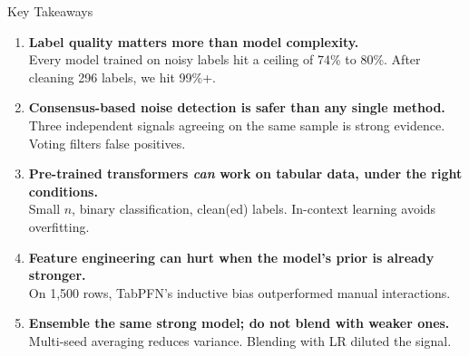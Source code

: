 \documentclass[aspectratio=169, 11pt]{beamer}
\begin{document}
\begin{frame}{Key Takeaways}

\begin{enumerate}
  \item \textbf{Label quality matters more than model complexity.}\\
        Every model trained on noisy labels hit a ceiling of 74\% to 80\%. After cleaning 296 labels, we hit 99\%+.

  \vspace{0.3em}
  \item \textbf{Consensus-based noise detection is safer than any single method.}\\
        Three independent signals agreeing on the same sample is strong evidence. Voting filters false positives.

  \vspace{0.3em}
  \item \textbf{Pre-trained transformers \textit{can} work on tabular data, under the right conditions.}\\
        Small $n$, binary classification, clean(ed) labels. In-context learning avoids overfitting.

  \vspace{0.3em}
  \item \textbf{Feature engineering can hurt when the model's prior is already stronger.}\\
        On 1{,}500 rows, TabPFN's inductive bias outperformed manual interactions.

  \vspace{0.3em}
  \item \textbf{Ensemble the same strong model; do not blend with weaker ones.}\\
        Multi-seed averaging reduces variance. Blending with LR diluted the signal.
\end{enumerate}
\end{frame}
\end{document}
